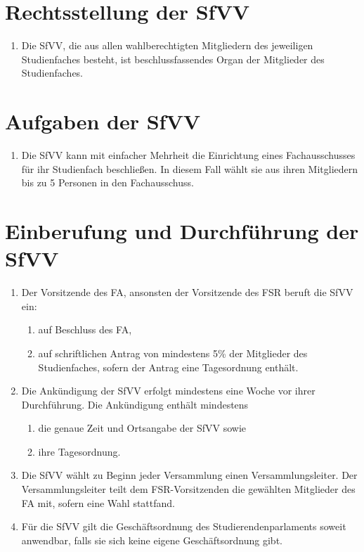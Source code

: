 \documentclass{article}
\providecommand{\tightlist}{\setlength{\itemsep}{0pt}\setlength{\parskip}{0pt}}
\begin{document}
\section{Rechtsstellung der SfVV}\label{rechtsstellung-der-sfvv}

\begin{enumerate}[(1)]
	\item Die SfVV, die aus allen wahlberechtigten Mitgliedern des jeweiligen Studienfaches besteht, ist beschlussfassendes Organ der Mitglieder des Studienfaches.
\end{enumerate}

\section{Aufgaben der SfVV}\label{aufgaben-der-sfvv}

\begin{enumerate}[(1)]
	\item Die SfVV kann mit einfacher Mehrheit die Einrichtung eines Fachausschusses für ihr Studienfach beschließen. In diesem Fall wählt sie aus ihren Mitgliedern bis zu 5 Personen in den Fachausschuss.
\end{enumerate}

\section{Einberufung und Durchführung der SfVV}\label{einberufung-und-durchfuxfchrung-der-sfvv}

\begin{enumerate}[(1)]
	\item Der Vorsitzende des FA, ansonsten der Vorsitzende des FSR beruft die SfVV ein:
	\begin{enumerate}[1.]
		\tightlist
		\item auf Beschluss des FA,
		\item auf schriftlichen Antrag von mindestens 5\% der Mitglieder des Studienfaches, sofern der Antrag eine Tagesordnung enthält.
	\end{enumerate}
	\item Die Ankündigung der SfVV erfolgt mindestens eine Woche vor ihrer Durchführung. Die Ankündigung enthält mindestens
	\begin{enumerate}[1.]
		\tightlist
		\item die genaue Zeit und Ortsangabe der SfVV sowie
		\item ihre Tagesordnung.
	\end{enumerate}
	\item Die SfVV wählt zu Beginn jeder Versammlung einen Versammlungsleiter. Der Versammlungsleiter teilt dem FSR-Vorsitzenden die gewählten Mitglieder des FA mit, sofern eine Wahl stattfand.
	\item Für die SfVV gilt die Geschäftsordnung des Studierendenparlaments soweit anwendbar, falls sie sich keine eigene Geschäftsordnung gibt.
\end{enumerate}
\end{document}
